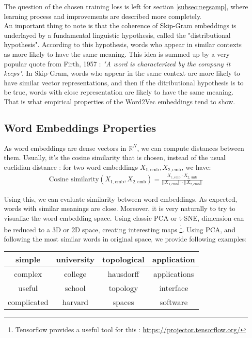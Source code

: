 \documentclass{article}
\newcommand{\R}{\mathbb R}
\begin{document}
The question of the chosen training loss is left for section \ref{subsec:negsamp}, where learning 
process and improvements are described more completely.  \\ 

An important thing to note is that the coherence of Skip-Gram embeddings
 is underlayed by a fundamental linguistic hypothesis, 
called the "distributional hypothesis". According to this hypothesis, 
words who appear in similar contexts as more likely to have the 
same meaning. This idea is summed up by a very popular quote from Firth, 1957 : \textit{"A word is characterized by 
the company it keeps"}. In Skip-Gram, words who appear in the same context are more likely to have 
similar vector representations, and then if the ditributional hypothesis is to be true, words with 
close representation are likely to have the same meaning. That is what empirical properties 
of the Word2Vec embeddings tend to show.

\subsection{Word Embeddings Properties}

As word embeddings are dense vectors in $\R^{N}$, we can compute distances between them. 
Usually, it's the cosine similarity that is chosen, instead of the usual euclidian distance : for two 
word embeddings $X_{1, \text{emb}}, X_{2, \text{emb}}$, we have:
\begin{align*}
    \text{Cosine similarity}(X_{1, \text{emb}}, X_{2, \text{emb}}) =
    \frac{
          X_{1, \text{emb}} \cdot X_{2, \text{emb}}
         }{
        || X_{1, \text{emb}} || \cdot|| X_{2, \text{emb}}||
         }
\end{align*}

\noindent Using this, we can evaluate similarity between word embeddings. As expected, words
with similar meanings are close. Moreover, it is very naturally to try to visualize
the word embedding space. Using classic PCA or t-SNE, dimension can be reduced to a 3D or 2D space, 
creating interesting maps \footnote{Tensorflow provides a useful tool for this : \href{https://projector.tensorflow.org/}{https://projector.tensorflow.org/}}.  
Using PCA, and following the most similar words in original space, we provide following examples: 

\begin{center}
    \begin{tabular}{|c|c|c|c|} \hline
        simple  &university&topological&application\\ \hline
        complex & college & hausdorff & applications \\
        useful  & school & topology & interface \\
        complicated& harvard & spaces & software \\ \hline
    \end{tabular}
\end{center}
\end{document}
